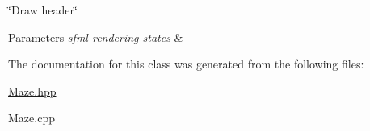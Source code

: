 \char`\"{}\+Draw header\char`\"{} 


\begin{DoxyParams}{Parameters}
{\em sfml rendering states} & \\
\hline
\end{DoxyParams}


The documentation for this class was generated from the following files\+:\begin{DoxyCompactItemize}
\item 
\hyperlink{Maze_8hpp}{Maze.\+hpp}\item 
Maze.\+cpp\end{DoxyCompactItemize}
